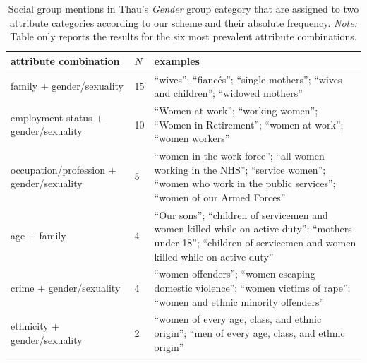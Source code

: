 \begin{table}[!th]
\centering
\caption{Social group mentions in Thau's \emph{Gender} group category that are assigned to two attribute categories according to our scheme and their absolute frequency. \emph{Note:} Table only reports the results for the six most prevalent attribute combinations.}
\label{tableC09}
\begin{tabular}{p{2.2in} l p{3in}}
\toprule
attribute combination & $N$ & examples \\
\midrule
family + gender/sexuality & 15 & ``wives''; ``fiancés''; ``single mothers''; ``wives and children''; ``widowed mothers'' \\
employment status + gender/sexuality & 10 & ``Women at work''; ``working women''; ``Women in Retirement''; ``women at work''; ``women workers'' \\
occupation/profession + gender/sexuality & 5 & ``women in the work-force''; ``all women working in the NHS''; ``service women''; ``women who work in the public services''; ``women of our Armed Forces'' \\
age + family & 4 & ``Our sons''; ``children of servicemen and women killed while on active duty''; ``mothers under 18''; ``children of servicemen and women killed while on active duty'' \\
crime + gender/sexuality & 4 & ``women offenders''; ``women escaping domestic violence''; ``women victims of rape''; ``women and ethnic minority offenders'' \\
ethnicity + gender/sexuality & 2 & ``women of every age, class, and ethnic origin''; ``men of every age, class, and ethnic origin'' \\
\bottomrule
\end{tabular}
\end{table}
